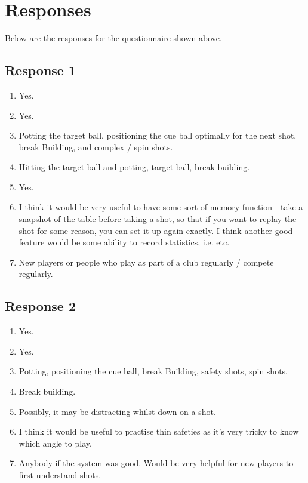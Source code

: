 \documentclass[ %
                author={Finn Alexander Wilkinson},
                supervisor={Dr. Andrew Calway},
                degree={MEng},
                title={\centering A Mixed Reality Aim Assistant for Pool and Snooker},
                subtitle={},
                type={Enterprise},
                year={2021} ]{dissertation}
\begin{document}
\section{Responses}
Below are the responses for the questionnaire shown above. 

\subsection{Response 1}
\begin{enumerate}
    \item Yes.
    \item Yes.
    \item Potting the target ball, positioning the cue ball optimally for the next shot, break Building, and complex / spin shots.
    \item Hitting the target ball and potting, target ball, break building.
    \item Yes.
    \item I think it would be very useful to have some sort of memory function - take a snapshot of the table
before taking a shot, so that if you want to replay the shot for some reason, you can set it up again
exactly. I think another good feature would be some ability to record statistics, i.e. %
etc. 
   \item New players or people who play as part of a club regularly / compete regularly.
\end{enumerate}

\subsection{Response 2}
\begin{enumerate}
    \item Yes.
    \item Yes.
    \item Potting, positioning the cue ball, break Building, safety shots, spin shots.
    \item Break building.
    \item Possibly, it may be distracting whilst down on a shot.
    \item I think it would be useful to practise thin safeties as it's very tricky to know which angle to play.
    \item Anybody if the system was good. Would be very helpful for new players to first understand shots.
\end{enumerate}
\end{document}
